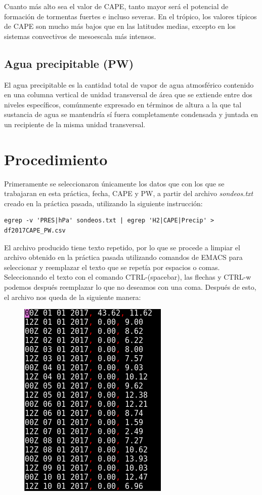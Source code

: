 \documentclass{article}
\begin{document}
Cuanto más alto sea el valor de CAPE, tanto mayor será el potencial de formación de tormentas fuertes e incluso severas. En el trópico, los valores típicos de CAPE son mucho más bajos que en las latitudes medias, excepto en los sistemas convectivos de mesoescala más intensos.

\subsection{Agua precipitable (PW)}

El agua precipitable es la cantidad total de vapor de agua atmosférico contenido en una columna vertical de unidad transversal de área que se extiende entre dos niveles específicos, comúnmente expresado en términos de altura a la que tal sustancia de agua se mantendría sí fuera completamente condensada y juntada en un recipiente de la misma unidad transversal.

\section{Procedimiento}

Primeramente se seleccionaron únicamente los datos que con los que se trabajaran en esta práctica, fecha, CAPE y PW, a partir del archivo \textit{sondeos.txt} creado en la práctica pasada, utilizando la siguiente instrucción: 
\begin{verbatim}
egrep -v 'PRES|hPa' sondeos.txt | egrep 'H2|CAPE|Precip' > df2017CAPE_PW.csv
\end{verbatim}

El archivo producido tiene texto repetido, por lo que se procede a limpiar el archivo obtenido en la práctica pasada utilizando comandos de EMACS para seleccionar y reemplazar el texto que se repetía por espacios o comas. Seleccionando el texto con el comando CTRL-(spacebar), las flechas y CTRL-w podemos después reemplazar lo que no deseamos con una coma. Después de esto, el archivo nos queda de la siguiente manera:

\begin{figure}[ht!]
\centering
\includegraphics[width=0.3\linewidth]{df2017.png}
\end{figure}
\end{document}
